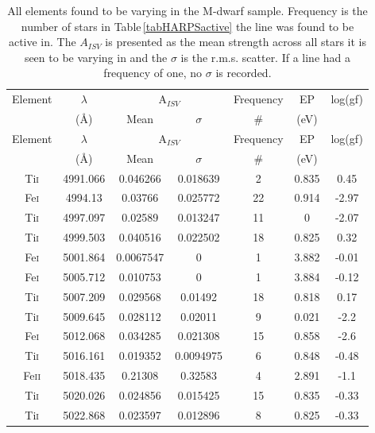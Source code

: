 \begin{longtable}{|c|c|c|c|c|c|c|}
    \hline
    Element & $\lambda$ & \multicolumn{2}{c|}{A$_{ISV}$} & Frequency & EP & log(gf)\\
    \cline{3-4}
 & (\hbox{\AA}) & Mean & $\sigma$ & \# & (eV) & \\
    \hline
    \endfirsthead
    
    \hline
    Element & $\lambda$ & \multicolumn{2}{c|}{A$_{ISV}$} & Frequency & EP & log(gf)\\
    \cline{3-4}
 & (\hbox{\AA}) & Mean & $\sigma$ & \# & (eV) & \\
    \hline
    \endhead
    
    \hline
    \endfoot
    
    \hline
    \caption{All elements found to be varying in the M-dwarf sample. Frequency is the number of stars in Table\,\ref{tabHARPSactive} the line was found to be active in. The $A_{ISV}$ is presented as the mean strength across all stars it is seen to be varying in and the $\sigma$ is the r.m.s. scatter. If a line had a frequency of one, no $\sigma$ is recorded.}
    \label{tabElementFull}
    \endlastfoot
Ti\textsc{i} & 4991.066 & 0.046266 & 0.018639 & 2 & 0.835 & 0.45 \\   
Fe\textsc{i} & 4994.13 & 0.03766 & 0.025772 & 22 & 0.914 & -2.97 \\   
Ti\textsc{i} & 4997.097 & 0.02589 & 0.013247 & 11 & 0 & -2.07 \\      
Ti\textsc{i} & 4999.503 & 0.040516 & 0.022502 & 18 & 0.825 & 0.32 \\  
Fe\textsc{i} & 5001.864 & 0.0067547 & 0 & 1 & 3.882 & -0.01 \\        
Fe\textsc{i} & 5005.712 & 0.010753 & 0 & 1 & 3.884 & -0.12 \\         
Ti\textsc{i} & 5007.209 & 0.029568 & 0.01492 & 18 & 0.818 & 0.17 \\   
Ti\textsc{i} & 5009.645 & 0.028112 & 0.02011 & 9 & 0.021 & -2.2 \\    
Fe\textsc{i} & 5012.068 & 0.034285 & 0.021308 & 15 & 0.858 & -2.6 \\  
Ti\textsc{i} & 5016.161 & 0.019352 & 0.0094975 & 6 & 0.848 & -0.48 \\ 
Fe\textsc{ii} & 5018.435 & 0.21308 & 0.32583 & 4 & 2.891 & -1.1 \\     
Ti\textsc{i} & 5020.026 & 0.024856 & 0.015425 & 15 & 0.835 & -0.33 \\ 
Ti\textsc{i} & 5022.868 & 0.023597 & 0.012896 & 8 & 0.825 & -0.33 \\  

\end{longtable}
